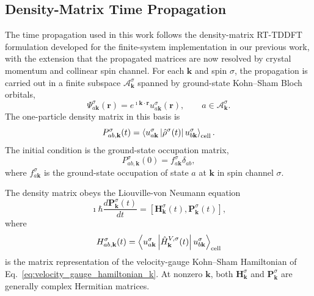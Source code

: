 \subsection{Density-Matrix Time Propagation}
\label{sec:density-matrix-propagation}

The time propagation used in this work follows the density-matrix
RT-TDDFT formulation developed for the finite-system implementation in
our previous work,\cite{jakowski-rmg-tddft-2025} with the extension that
the propagated matrices are now resolved by crystal momentum and
collinear spin channel.  For each $\mathbf k$ and spin $\sigma$, the
propagation is carried out in a finite subspace
$\mathcal A_{\mathbf k}^{\sigma}$ spanned by ground-state Kohn--Sham
Bloch orbitals,
\begin{equation}
  \Psi_{a\mathbf k}^{\sigma}(\mathbf r)
  =
  e^{\imath\mathbf k\cdot\mathbf r}
  u_{a\mathbf k}^{\sigma}(\mathbf r),
  \qquad
  a\in\mathcal A_{\mathbf k}^{\sigma}.
  \label{eq:tddft_active_bloch_basis}
\end{equation}
The one-particle density matrix in this basis is
\begin{equation}
  P_{ab,\mathbf k}^{\sigma}(t)
  =
  \left\langle
    u_{a\mathbf k}^{\sigma}
    \left|
    \hat\rho^{\sigma}(t)
    \right|
    u_{b\mathbf k}^{\sigma}
  \right\rangle_{\rm cell}.
  \label{eq:density_matrix_definition_kspin}
\end{equation}
The initial condition is the ground-state occupation matrix,
\begin{equation}
  P_{ab,\mathbf k}^{\sigma}(0)
  =
  f_{a\mathbf k}^{\sigma}\delta_{ab},
  \label{eq:initial_density_matrix_kspin}
\end{equation}
where $f_{a\mathbf k}^{\sigma}$ is the ground-state occupation of state
$a$ at $\mathbf k$ in spin channel $\sigma$.

The density matrix obeys the Liouville-von Neumann equation
\begin{equation}
  \imath\hbar
  \frac{d\mathbf P_{\mathbf k}^{\sigma}(t)}{dt}
  =
  \left[
    \mathbf H_{\mathbf k}^{\sigma}(t),
    \mathbf P_{\mathbf k}^{\sigma}(t)
  \right],
  \label{eq:lvn_kspin}
\end{equation}
where
\begin{equation}
  H_{ab,\mathbf k}^{\sigma}(t)
  =
  \left\langle
    u_{a\mathbf k}^{\sigma}
    \left|
    \hat H_{\mathbf k}^{V,\sigma}(t)
    \right|
    u_{b\mathbf k}^{\sigma}
  \right\rangle_{\rm cell}
  \label{eq:hamiltonian_matrix_kspin}
\end{equation}
is the matrix representation of the velocity-gauge Kohn--Sham
Hamiltonian of Eq.~\eqref{eq:velocity_gauge_hamiltonian_k}.  At
nonzero $\mathbf k$, both $\mathbf H_{\mathbf k}^{\sigma}$ and
$\mathbf P_{\mathbf k}^{\sigma}$ are generally complex Hermitian
matrices.

